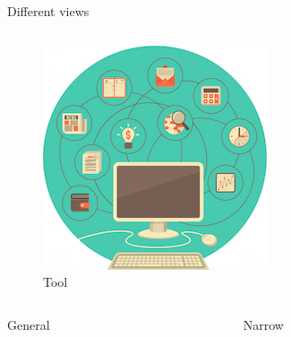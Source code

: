 \begin{frame}{Different views}
\begin{columns}
\begin{column}{.5\textwidth}
			\begin{figure}
				\includegraphics[width=.75\textwidth, center]{figures/WHU-lesson-6}
				\caption*{Tool}
			\end{figure}
		\end{column}
	\end{columns}
	\begin{columns}
		\begin{column}{.5\textwidth}
			\begin{center}
				General
			\end{center}
		\end{column}
		\begin{column}{.5\textwidth}
			\begin{center}
				Narrow
			\end{center}
		\end{column}
	\end{columns}
\end{frame}



